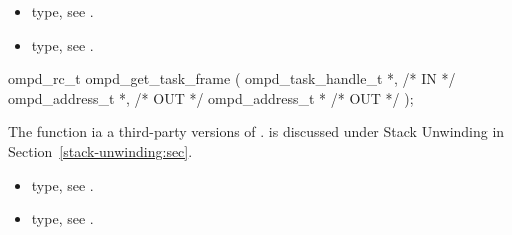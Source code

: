 \argdesc

\crossreferences
\begin{itemize}
	\item {} type, see .
	\item {} type, see .
\end{itemize}



%
\summary

\format
\cspecificstart
\begin{boxedcode}
ompd\_rc\_t ompd\_get\_task\_frame (
  ompd\_task\_handle\_t        *,                           /* IN */
  ompd\_address\_t            *,                    /* OUT */
  ompd\_address\_t            *                  /* OUT */
);
\end{boxedcode}
\cspecificend

\descr
The function 
ia a third-party versions of .
%
 is discussed under Stack Unwinding in
Section~\ref{stack-unwinding:sec}.
%

\argdesc

\crossreferences
\begin{itemize}
	\item {} type, see .
	\item {} type, see .
\end{itemize}

%

